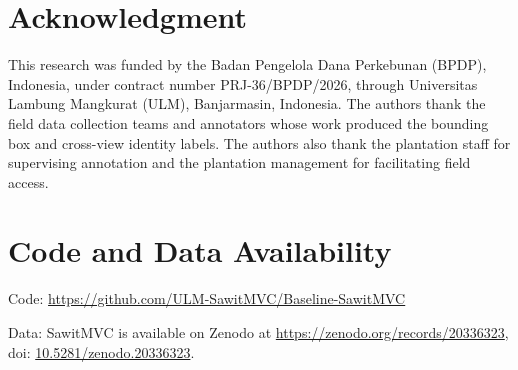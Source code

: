 \documentclass[conference]{IEEEtran}
\begin{document}
\section*{Acknowledgment}

This research was funded by the Badan Pengelola Dana Perkebunan (BPDP),
Indonesia, under contract number PRJ-36/BPDP/2026, through Universitas Lambung
Mangkurat (ULM), Banjarmasin, Indonesia. The authors thank the field data
collection teams and annotators whose work produced the bounding box and
cross-view identity labels. The authors also thank the plantation staff for
supervising annotation and the plantation management for facilitating field
access.

\section*{Code and Data Availability}

Code: \url{https://github.com/ULM-SawitMVC/Baseline-SawitMVC}

Data: SawitMVC is available on Zenodo at
\url{https://zenodo.org/records/20336323}, doi:
\url{10.5281/zenodo.20336323}.
\end{document}
